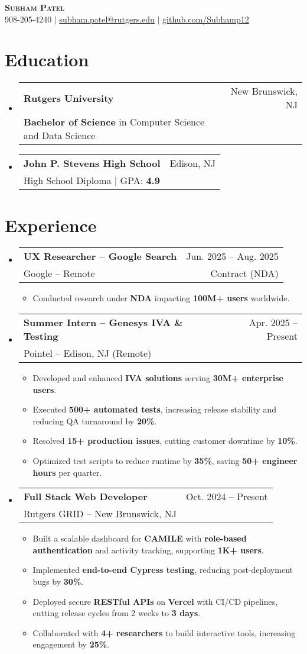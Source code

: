 \documentclass[letterpaper,11pt]{article}
\makeatletter
\newcommand{\resumeItem}[1]{
  \item\small{
    {#1 \vspace{-2pt}}
  }
}
\newcommand{\resumeSubheading}[4]{
  \vspace{-2pt}\item
    \begin{tabular*}{0.97\textwidth}[t]{l@{\extracolsep{\fill}}r}
      \textbf{#1} & #2 \\
      {\small#3} & {\small #4} \\
    \end{tabular*}\vspace{-7pt}
}
\newcommand{\resumeItemListStart}{\begin{itemize}}
\newcommand{\resumeItemListEnd}{\end{itemize}\vspace{-5pt}}
\makeatother
\begin{document}
\begin{center}
    \textbf{\Huge \scshape Subham Patel} \\ \vspace{1pt}
    \small 908-205-4240 $|$ \href{mailto:subham.patel@rutgers.edu}{\underline{subham.patel@rutgers.edu}} $|$ 
    \href{https://github.com/Subhamp12}{\underline{github.com/Subhamp12}}
\end{center}

\section{Education}
  \begin{itemize}[leftmargin=0.15in, label={}]
    \resumeSubheading
      {Rutgers University}{New Brunswick, NJ}
      {\textbf{Bachelor of Science} in Computer Science and Data Science}{}
    \resumeSubheading
      {John P. Stevens High School}{Edison, NJ}
      {High School Diploma | GPA: \textbf{4.9}}{}
  \end{itemize}

\section{Experience}
  \begin{itemize}[leftmargin=0.15in, label={}]
    \resumeSubheading
      {UX Researcher – Google Search}{Jun. 2025 -- Aug. 2025}
      {Google -- Remote}{Contract (NDA)}
      \resumeItemListStart
        \resumeItem{Conducted research under \textbf{NDA} impacting \textbf{100M+ users} worldwide.}
      \resumeItemListEnd

    \resumeSubheading
      {Summer Intern – Genesys IVA \& Testing}{Apr. 2025 -- Present}
      {Pointel -- Edison, NJ (Remote)}{}
      \resumeItemListStart
        \resumeItem{Developed and enhanced \textbf{IVA solutions} serving \textbf{30M+ enterprise users}.}
        \resumeItem{Executed \textbf{500+ automated tests}, increasing release stability and reducing QA turnaround by \textbf{20\%}.}
        \resumeItem{Resolved \textbf{15+ production issues}, cutting customer downtime by \textbf{10\%}.}
        \resumeItem{Optimized test scripts to reduce runtime by \textbf{35\%}, saving \textbf{50+ engineer hours} per quarter.}
      \resumeItemListEnd

    \resumeSubheading
      {Full Stack Web Developer}{Oct. 2024 -- Present}
      {Rutgers GRID -- New Brunswick, NJ}{}
      \resumeItemListStart
        \resumeItem{Built a scalable dashboard for \textbf{CAMILE} with \textbf{role-based authentication} and activity tracking, supporting \textbf{1K+ users}.}
        \resumeItem{Implemented \textbf{end-to-end Cypress testing}, reducing post-deployment bugs by \textbf{30\%}.}
        \resumeItem{Deployed secure \textbf{RESTful APIs} on \textbf{Vercel} with CI/CD pipelines, cutting release cycles from 2 weeks to \textbf{3 days}.}
        \resumeItem{Collaborated with \textbf{4+ researchers} to build interactive tools, increasing engagement by \textbf{25\%}.}
      \resumeItemListEnd
  \end{itemize}
\end{document}
